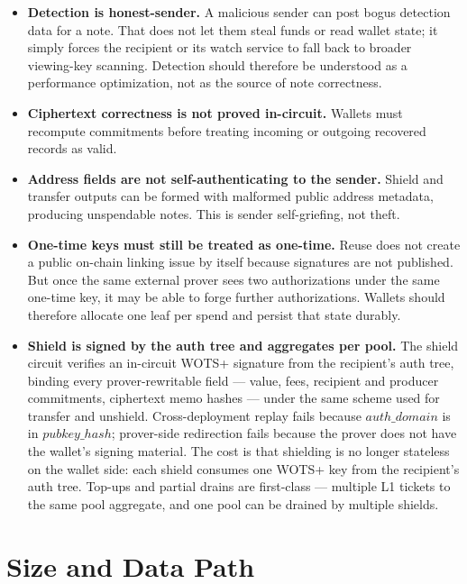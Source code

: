\documentclass[11pt]{article}
\begin{document}
\begin{itemize}
  \item \textbf{Detection is honest-sender.} A malicious sender can post bogus
        detection data for a note. That does not let them steal funds or read
        wallet state; it simply forces the recipient or its watch service to
        fall back to broader viewing-key scanning. Detection should therefore
        be understood as a performance optimization, not as the source of note
        correctness.
  \item \textbf{Ciphertext correctness is not proved in-circuit.} Wallets must
        recompute commitments before treating incoming or outgoing recovered
        records as valid.
  \item \textbf{Address fields are not self-authenticating to the sender.}
        Shield and transfer outputs can be formed with malformed public address
        metadata, producing unspendable notes. This is sender self-griefing,
        not theft.
  \item \textbf{One-time keys must still be treated as one-time.} Reuse does
        not create a public on-chain linking issue by itself because signatures
        are not published. But once the same external prover sees two
        authorizations under the same one-time key, it may be able to forge
        further authorizations. Wallets should therefore allocate one leaf per
        spend and persist that state durably.
  \item \textbf{Shield is signed by the auth tree and aggregates per
        pool.} The shield circuit verifies an in-circuit WOTS+ signature
        from the recipient's auth tree, binding every prover-rewritable
        field --- value, fees, recipient and producer commitments,
        ciphertext memo hashes --- under the same scheme used for
        transfer and unshield. Cross-deployment replay fails because
        \(auth\_domain\) is in \(pubkey\_hash\); prover-side redirection
        fails because the prover does not have the wallet's signing
        material. The cost is that shielding is no longer stateless on
        the wallet side: each shield consumes one WOTS+ key from the
        recipient's auth tree. Top-ups and partial drains are first-class
        — multiple L1 tickets to the same pool aggregate, and one pool
        can be drained by multiple shields.
\end{itemize}

\section{Size and Data Path}
\end{document}
